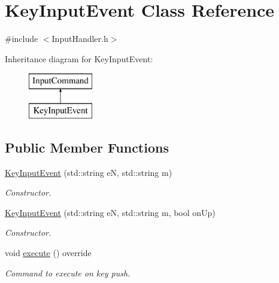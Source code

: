 \hypertarget{class_key_input_event}{\section{Key\+Input\+Event Class Reference}
\label{class_key_input_event}
}


{\ttfamily \#include $<$Input\+Handler.\+h$>$}

Inheritance diagram for Key\+Input\+Event\+:\begin{figure}[H]
\begin{center}
\leavevmode
\includegraphics[height=2.000000cm]{class_key_input_event}
\end{center}
\end{figure}
\subsection*{Public Member Functions}
\begin{DoxyCompactItemize}
\item 
\hypertarget{class_key_input_event_a1efbabce2c329de646985d2866bc349b}{\hyperlink{class_key_input_event_a1efbabce2c329de646985d2866bc349b}{Key\+Input\+Event} (std\+::string e\+N, std\+::string m)}\label{class_key_input_event_a1efbabce2c329de646985d2866bc349b}

\begin{DoxyCompactList}\small\item\em Constructor. \end{DoxyCompactList}\item 
\hypertarget{class_key_input_event_a1275e31313079f5258618302153c0d88}{\hyperlink{class_key_input_event_a1275e31313079f5258618302153c0d88}{Key\+Input\+Event} (std\+::string e\+N, std\+::string m, bool on\+Up)}\label{class_key_input_event_a1275e31313079f5258618302153c0d88}

\begin{DoxyCompactList}\small\item\em Constructor. \end{DoxyCompactList}\item 
\hypertarget{class_key_input_event_ae607856dd9443a66ee1a1f6446f964cc}{void \hyperlink{class_key_input_event_ae607856dd9443a66ee1a1f6446f964cc}{execute} () override}\label{class_key_input_event_ae607856dd9443a66ee1a1f6446f964cc}

\begin{DoxyCompactList}\small\item\em Command to execute on key push. \end{DoxyCompactList}\end{DoxyCompactItemize}
